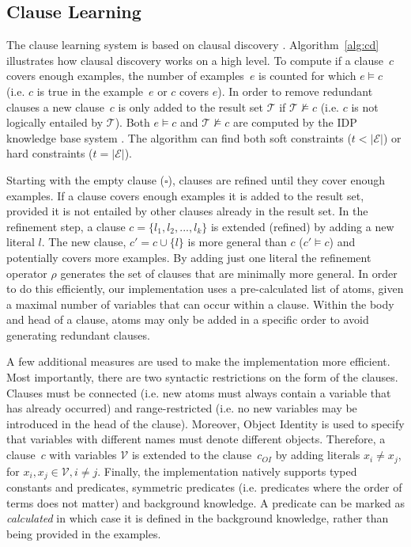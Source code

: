 \documentclass[letterpaper]{article}
\newcommand{\sym}[1]{\ensuremath{\mathcal{#1}}}
\theoremstyle{definition}
\newcommand{\abs}[1]{\left|#1\right|}
\begin{document}
\subsection{Clause Learning}
The clause learning system is based on clausal discovery \cite{DeRaedt:ClausalDiscovery}.
Algorithm~\ref{alg:cd} illustrates how clausal discovery works on a high level.
To compute if a clause~$c$ covers enough examples, the number of examples~$e$ is counted for which $e \models c$ (i.e. $c$ is true in the example~$e$ or $c$ covers $e$).
In order to remove redundant clauses a new clause~$c$ is only added to the result set $\sym{T}$ if $\sym{T} \not\models c$ (i.e. $c$ is not logically entailed by \sym{T}).
Both $e \models c$ and $\sym{T} \not\models c$ are computed by the IDP knowledge base system \cite{de2013prototype,wittocx2008idp}.
The algorithm can find both soft constraints ($t < \abs{\sym{E}}$) or hard constraints ($t = \abs{\sym{E}}$).

Starting with the empty clause ($\square$), clauses are refined until they cover enough examples.
If a clause covers enough examples it is added to the result set, provided it is not entailed by other clauses already in the result set.
In the refinement step, a clause $c = \{l_1, l_2, ..., l_k\}$ is extended (refined) by adding a new literal $l$.
The new clause, $c' = c \cup \{l\}$ is more general than $c$ ($c' \models c$) and potentially covers more examples.
By adding just one literal the refinement operator $\rho$ generates the set of clauses that are minimally more general.
In order to do this efficiently, our implementation uses a pre-calculated list of atoms, given a maximal number of variables that can occur within a clause.
Within the body and head of a clause, atoms may only be added in a specific order to avoid generating redundant clauses.

A few additional measures are used to make the implementation more efficient.
Most importantly, there are two syntactic restrictions on the form of the clauses.
Clauses must be connected (i.e. new atoms must always contain a variable that has already occurred) and range-restricted (i.e. no new variables may be introduced in the head of the clause).
Moreover, Object Identity is used to specify that variables with different names must denote different objects.
Therefore, a clause~$c$ with variables \sym{V} is extended to the clause~$c_{OI}$ by adding literals $x_i \neq x_j$, for $x_i, x_j \in \sym{V}, i \neq j$.
Finally, the implementation natively supports typed constants and predicates, symmetric predicates (i.e. predicates where the order of terms does not matter) and background knowledge.
A predicate can be marked as \emph{calculated} in which case it is defined in the background knowledge, rather than being provided in the examples. 
\end{document}
